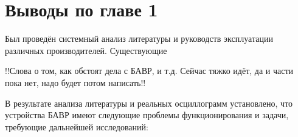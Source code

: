 
\section{Выводы по главе 1}
\label{sec:ch1_conclusions}

Был проведён системный анализ литературы и руководств эксплуатации различных производителей. Существующие

!!Слова о том, как обстоят дела с БАВР, и т.д. Сейчас тяжко идёт, да и части пока нет, надо будет потом написать!!

В результате анализа литературы и реальных осциллограмм установлено, что устройства БАВР
имеют следующие проблемы функционирования и задачи, требующие дальнейшей исследований:


